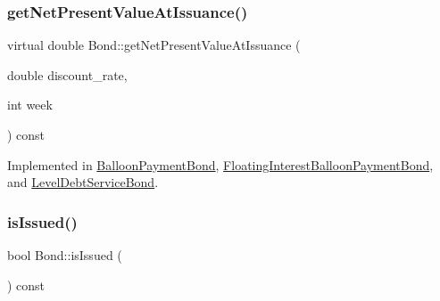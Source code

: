 \mbox{\label{classBond_a5997278813deb16aa5d01bbca8ecc7b2_a5997278813deb16aa5d01bbca8ecc7b2}} 
\subsubsection{\texorpdfstring{get\+Net\+Present\+Value\+At\+Issuance()}{getNetPresentValueAtIssuance()}}
{\footnotesize\ttfamily virtual double Bond\+::get\+Net\+Present\+Value\+At\+Issuance (\begin{DoxyParamCaption}\item[{double}]{discount\+\_\+rate,  }\item[{int}]{week }\end{DoxyParamCaption}) const\hspace{0.3cm}{\ttfamily [pure virtual]}}



Implemented in \mbox{\hyperlink{classBalloonPaymentBond_a11e5aecaf542cfbbb2303e98fb0b93bf_a11e5aecaf542cfbbb2303e98fb0b93bf}{Balloon\+Payment\+Bond}}, \mbox{\hyperlink{classFloatingInterestBalloonPaymentBond_a90205e26e09eef1227f8c0671ca4fce2_a90205e26e09eef1227f8c0671ca4fce2}{Floating\+Interest\+Balloon\+Payment\+Bond}}, and \mbox{\hyperlink{classLevelDebtServiceBond_a0f5820c3e76b8b908dbe153a8291d96a_a0f5820c3e76b8b908dbe153a8291d96a}{Level\+Debt\+Service\+Bond}}.

\mbox{\label{classBond_a6342f3dd3295771b71ac1fcc3b666a42_a6342f3dd3295771b71ac1fcc3b666a42}} 
\subsubsection{\texorpdfstring{is\+Issued()}{isIssued()}}
{\footnotesize\ttfamily bool Bond\+::is\+Issued (\begin{DoxyParamCaption}{ }\end{DoxyParamCaption}) const}

\mbox{\label{classBond_a377db8c18b83c4666e46686bc26adef1_a377db8c18b83c4666e46686bc26adef1}} 
